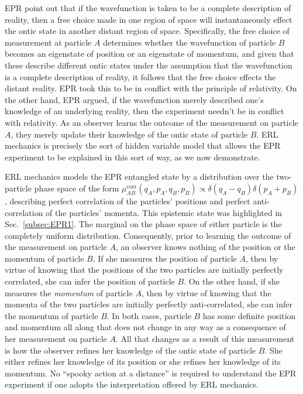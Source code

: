 \documentclass[pra,superscriptaddress,nofootinbib,12pt]{revtex4-2}
\begin{document}
EPR point out that if the wavefunction is taken to be a complete description of reality, then a free choice made in one region of space will instantaneously effect the ontic state in another distant region of space.  Specifically, the free choice of measurement at particle $A$ determines whether the wavefunction of particle $B$ becomes an eigenstate of position or an eigenstate of momentum, and given that these describe different ontic states under the assumption that the wavefunction is a complete description of reality, it follows that the free choice effects the distant reality.  EPR took this to be in conflict with the principle of relativity.  On the other hand, EPR argued, if the wavefunction merely described one's knowledge of an underlying reality, then the experiment needn't be in conflict with relativity.  As an observer learns the outcome of the measurement on particle $A$,  they merely update their knowledge of the ontic state of particle $B$. ERL mechanics is precisely the sort of hidden variable model that allows the EPR experiment to be explained in this sort of way, as we now demonstrate.

ERL mechanics models the EPR entangled state by a distribution over the two-particle phase space of the form $\mu^{\text{corr}}_{AB}(q_A,p_A,q_B,p_B)\propto \delta(q_A - q_B)\delta(p_A+p_B)$, describing perfect correlation of the particles' positions and perfect anti-correlation of the particles' momenta.  This epistemic state was highlighted in Sec.~\ref{subsec:EPR1}.  The marginal on the phase space of either particle is the completely uniform distribution.  Consequently, prior to learning the outcome of the measurement on particle $A$, an observer knows nothing of the position or the momentum of particle $B$.  If she measures the position of particle $A$, then by virtue of knowing that the positions of the two particles are initially perfectly correlated, she can infer the position of particle $B$. On the other hand, if she measures the \emph{momentum} of particle $A$, then by virtue of knowing that the momenta of the two particles are initially perfectly anti-correlated, she can infer the momentum of particle $B$. In both cases, particle $B$ has some definite position and momentum all along that does not change in any way as a consequence of her measurement on particle $A$.  All that changes as a result of this measurement is how the observer refines her knowledge of the ontic state of particle $B$.  She either refines her knowledge of its position or she refines her knowledge of its momentum.  No ``spooky action at a distance'' is required to understand the EPR experiment if one adopts the interpretation offered by ERL mechanics.
\end{document}
